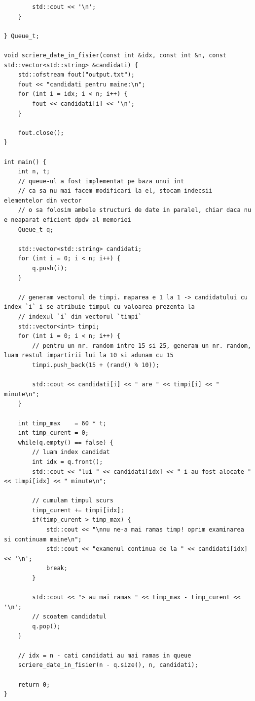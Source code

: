 \documentclass[12pt]{book}
\begin{document}
\begin{lstlisting}
        std::cout << '\n';
    }

} Queue_t;

void scriere_date_in_fisier(const int &idx, const int &n, const std::vector<std::string> &candidati) {
    std::ofstream fout("output.txt");
    fout << "candidati pentru maine:\n";
    for (int i = idx; i < n; i++) {
        fout << candidati[i] << '\n';
    }

    fout.close();
}

int main() {
    int n, t;
    // queue-ul a fost implementat pe baza unui int
    // ca sa nu mai facem modificari la el, stocam indecsii elementelor din vector
    // o sa folosim ambele structuri de date in paralel, chiar daca nu e neaparat eficient dpdv al memoriei
    Queue_t q;

    std::vector<std::string> candidati;
    for (int i = 0; i < n; i++) {
        q.push(i);
    }

    // generam vectorul de timpi. maparea e 1 la 1 -> candidatului cu index `i` i se atribuie timpul cu valoarea prezenta la
    // indexul `i` din vectorul `timpi`
    std::vector<int> timpi;
    for (int i = 0; i < n; i++) {
        // pentru un nr. random intre 15 si 25, generam un nr. random, luam restul impartirii lui la 10 si adunam cu 15
        timpi.push_back(15 + (rand() % 10));

        std::cout << candidati[i] << " are " << timpi[i] << " minute\n";
    }

    int timp_max    = 60 * t;
    int timp_curent = 0;
    while(q.empty() == false) {
        // luam index candidat
        int idx = q.front();
        std::cout << "lui " << candidati[idx] << " i-au fost alocate " << timpi[idx] << " minute\n";

        // cumulam timpul scurs
        timp_curent += timpi[idx];
        if(timp_curent > timp_max) {
            std::cout << "\nnu ne-a mai ramas timp! oprim examinarea si continuam maine\n";
            std::cout << "examenul continua de la " << candidati[idx] << '\n';
            break;
        }

        std::cout << "> au mai ramas " << timp_max - timp_curent << '\n';
        // scoatem candidatul
        q.pop();
    }

    // idx = n - cati candidati au mai ramas in queue
    scriere_date_in_fisier(n - q.size(), n, candidati);

    return 0;
}
\end{lstlisting}

\newpage
\end{document}
